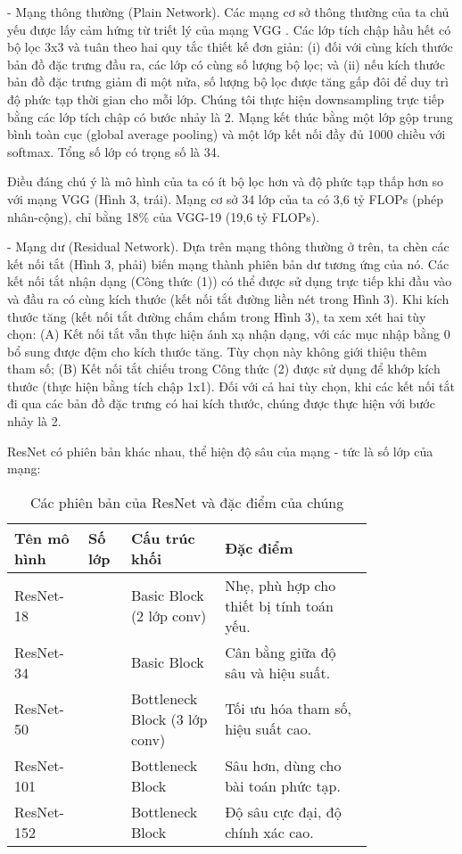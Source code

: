 \documentclass[../main.tex]{subfiles}
\begin{document}
- Mạng thông thường (Plain Network). Các mạng cơ sở thông thường của ta chủ yếu được lấy cảm hứng từ triết lý của mạng VGG . Các lớp tích chập hầu hết có bộ lọc 3x3 và tuân theo hai quy tắc thiết kế đơn giản: (i) đối với cùng kích thước bản đồ đặc trưng đầu ra, các lớp có cùng số lượng bộ lọc; và (ii) nếu kích thước bản đồ đặc trưng giảm đi một nửa, số lượng bộ lọc được tăng gấp đôi để duy trì độ phức tạp thời gian cho mỗi lớp. Chúng tôi thực hiện downsampling trực tiếp bằng các lớp tích chập có bước nhảy là 2. Mạng kết thúc bằng một lớp gộp trung bình toàn cục (global average pooling) và một lớp kết nối đầy đủ 1000 chiều với softmax. Tổng số lớp có trọng số là 34.

Điều đáng chú ý là mô hình của ta có ít bộ lọc hơn và độ phức tạp thấp hơn so với mạng VGG (Hình 3, trái). Mạng cơ sở 34 lớp của ta có 3,6 tỷ FLOPs (phép nhân-cộng), chỉ bằng 18\% của VGG-19 (19,6 tỷ FLOPs).

- Mạng dư (Residual Network). Dựa trên mạng thông thường ở trên, ta chèn các kết nối tắt (Hình 3, phải) biến mạng thành phiên bản dư tương ứng của nó. Các kết nối tắt nhận dạng (Công thức (1)) có thể được sử dụng trực tiếp khi đầu vào và đầu ra có cùng kích thước (kết nối tắt đường liền nét trong Hình 3). Khi kích thước tăng (kết nối tắt đường chấm chấm trong Hình 3), ta xem xét hai tùy chọn: (A) Kết nối tắt vẫn thực hiện ánh xạ nhận dạng, với các mục nhập bằng 0 bổ sung được đệm cho kích thước tăng. Tùy chọn này không giới thiệu thêm tham số; (B) Kết nối tắt chiếu  trong Công thức (2) được sử dụng để khớp kích thước (thực hiện bằng tích chập 1x1). Đối với cả hai tùy chọn, khi các kết nối tắt đi qua các bản đồ đặc trưng có hai kích thước, chúng được thực hiện với bước nhảy là 2.

ResNet có phiên bản khác nhau, thể hiện độ sâu của mạng - tức là số lớp của mạng:

\begin{table}[h]
\centering
\begin{tabular}{|>{\centering\arraybackslash}p{0.15\linewidth}|>{\centering\arraybackslash}p{0.10\linewidth}|>{\centering\arraybackslash}p{0.20\linewidth}|>{\centering\arraybackslash}p{0.35\linewidth}|}
\hline
\textbf{Tên mô hình} & \textbf{Số lớp} & \textbf{Cấu trúc khối} & \textbf{Đặc điểm} \\ \hline
ResNet-18 & 18 & Basic Block (2 lớp conv) & Nhẹ, phù hợp cho thiết bị tính toán yếu. \\ \hline
ResNet-34 & 34 & Basic Block & Cân bằng giữa độ sâu và hiệu suất. \\ \hline
ResNet-50 & 50 & Bottleneck Block (3 lớp conv) & Tối ưu hóa tham số, hiệu suất cao. \\ \hline
ResNet-101 & 101 & Bottleneck Block & Sâu hơn, dùng cho bài toán phức tạp. \\ \hline
ResNet-152 & 152 & Bottleneck Block & Độ sâu cực đại, độ chính xác cao. \\ \hline
\end{tabular}
\caption{Các phiên bản của ResNet và đặc điểm của chúng}
\end{table}
\end{document}
